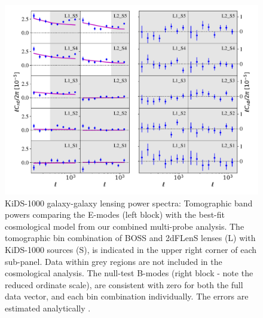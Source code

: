 \begin{figure}
        \includegraphics[width=\textwidth]{Data_Plots/Pgk/Pgk_K1000_2Dbins_v2_goldclasses_Flag_SOM_Fid_C.pdf}
        \caption{KiDS-1000 galaxy-galaxy lensing power spectra:
          Tomographic band powers comparing the E-modes (left block)
          with the best-fit
          cosmological model from our combined multi-probe analysis.  The tomographic 
        bin combination of BOSS and 2dFLenS lenses (L) with KiDS-1000
        sources (S), is indicated in the upper right corner of each
        sub-panel.  Data within grey regions are not included in the cosmological analysis.
        The null-test B-modes (right block - note the reduced ordinate scale), are
      consistent with zero for both the full data vector, and each
     bin combination individually.  The errors are estimated analytically \citep{joachimi/etal:inprep}.}
        \label{fig:Pgk}
\end{figure}



